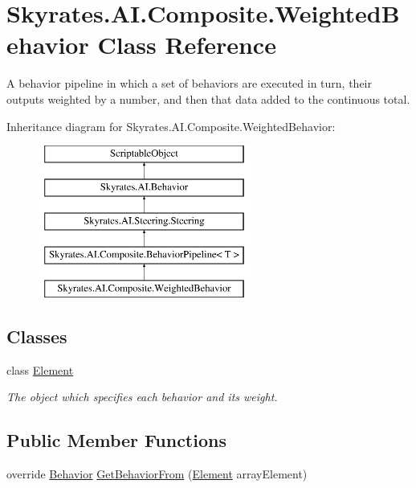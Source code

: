 \hypertarget{class_skyrates_1_1_a_i_1_1_composite_1_1_weighted_behavior}{\section{Skyrates.\-A\-I.\-Composite.\-Weighted\-Behavior Class Reference}
\label{class_skyrates_1_1_a_i_1_1_composite_1_1_weighted_behavior}
}


A behavior pipeline in which a set of behaviors are executed in turn, their outputs weighted by a number, and then that data added to the continuous total.  


Inheritance diagram for Skyrates.\-A\-I.\-Composite.\-Weighted\-Behavior\-:\begin{figure}[H]
\begin{center}
\leavevmode
\includegraphics[height=5.000000cm]{class_skyrates_1_1_a_i_1_1_composite_1_1_weighted_behavior}
\end{center}
\end{figure}
\subsection*{Classes}
\begin{DoxyCompactItemize}
\item 
class \hyperlink{class_skyrates_1_1_a_i_1_1_composite_1_1_weighted_behavior_1_1_element}{Element}
\begin{DoxyCompactList}\small\item\em The object which specifies each behavior and its weight. \end{DoxyCompactList}\end{DoxyCompactItemize}
\subsection*{Public Member Functions}
\begin{DoxyCompactItemize}
\item 
\hypertarget{class_skyrates_1_1_a_i_1_1_composite_1_1_weighted_behavior_a8c7272a7c2c3039f9cbd2a65ae6faa98}{override \hyperlink{class_skyrates_1_1_a_i_1_1_behavior}{Behavior} \hyperlink{class_skyrates_1_1_a_i_1_1_composite_1_1_weighted_behavior_a8c7272a7c2c3039f9cbd2a65ae6faa98}{Get\-Behavior\-From} (\hyperlink{class_skyrates_1_1_a_i_1_1_composite_1_1_weighted_behavior_1_1_element}{Element} array\-Element)}\label{class_skyrates_1_1_a_i_1_1_composite_1_1_weighted_behavior_a8c7272a7c2c3039f9cbd2a65ae6faa98}

\end{DoxyCompactItemize}
